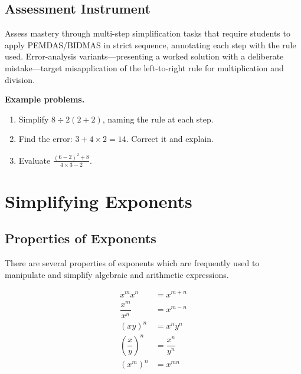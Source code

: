 \subsection{Assessment Instrument}
\label{ssec:asse-3669}


Assess mastery through multi-step simplification tasks that require
students to apply PEMDAS/BIDMAS in strict sequence, annotating each step
with the rule used. Error-analysis variants---presenting a worked solution
with a deliberate mistake---target misapplication of the left-to-right rule
for multiplication and division.

\textbf{Example problems.}
\begin{enumerate}
    \item Simplify $8 \div 2(2 + 2)$, naming the rule at each step.
    \item Find the error: $3 + 4 \times 2 = 14$. Correct it and explain.
    \item Evaluate $\frac{(6-2)^2 + 8}{4 \times 3 - 2}$.
\end{enumerate}



\section{Simplifying Exponents}
\label{sec:simp-e6c1}



\subsection{Properties of Exponents}
\label{sss:prop-3a99}




There are several properties of exponents which are frequently used to manipulate and
simplify algebraic and arithmetic expressions.



\begin{align}
x^m x^n & = x^{m+n} \\ \dfrac{x^m}{x^n} & = x^{m-n} \\ (xy)^n & = x^n y^n \\ \left( \dfrac{x}{y} \right) ^n & = \dfrac{x^n}{y^n} \\ (x^m)^n & = x^{mn}
\end{align}





